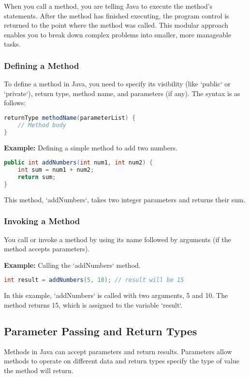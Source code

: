 \documentclass{article}
\begin{document}
When you call a method, you are telling Java to execute the method's statements. After the method has finished executing, the program control is returned to the point where the method was called. This modular approach enables you to break down complex problems into smaller, more manageable tasks.

\subsubsection{Defining a Method}
To define a method in Java, you need to specify its visibility (like `public` or `private`), return type, method name, and parameters (if any). The syntax is as follows:

\begin{lstlisting}[language=Java]
returnType methodName(parameterList) {
    // Method body
}
\end{lstlisting}

\textbf{Example:} Defining a simple method to add two numbers.

\begin{lstlisting}[language=Java]
public int addNumbers(int num1, int num2) {
    int sum = num1 + num2;
    return sum;
}
\end{lstlisting}

This method, `addNumbers`, takes two integer parameters and returns their sum.

\subsubsection{Invoking a Method}
You call or invoke a method by using its name followed by arguments (if the method accepts parameters).

\textbf{Example:} Calling the `addNumbers` method.

\begin{lstlisting}[language=Java]
int result = addNumbers(5, 10); // result will be 15
\end{lstlisting}

In this example, `addNumbers` is called with two arguments, 5 and 10. The method returns 15, which is assigned to the variable `result`.



\newpage
\subsection{Parameter Passing and Return Types}
Methods in Java can accept parameters and return results. Parameters allow methods to operate on different data and return types specify the type of value the method will return.
\end{document}
